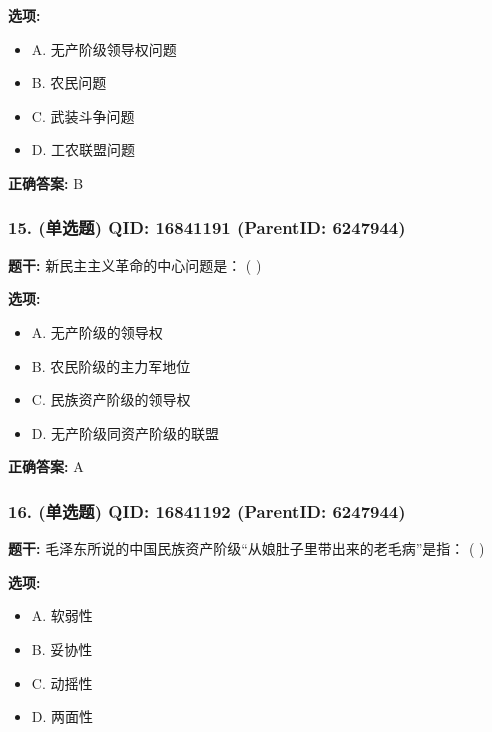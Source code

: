 \documentclass[12pt,UTF8]{ctexart}
\begin{document}
\textbf{选项:}
\begin{itemize}[leftmargin=*]

  \item A. 无产阶级领导权问题

  \item B. 农民问题

  \item C. 武装斗争问题

  \item D. 工农联盟问题

\end{itemize}

\textbf{正确答案:}
B

\vspace{0.3em}\hrulefill\vspace{0.7em}

\subsubsection*{15. (单选题) \small QID: 16841191 (ParentID: 6247944)}

\textbf{题干:}
新民主主义革命的中心问题是： ( )



\textbf{选项:}
\begin{itemize}[leftmargin=*]

  \item A. 无产阶级的领导权

  \item B. 农民阶级的主力军地位

  \item C. 民族资产阶级的领导权

  \item D. 无产阶级同资产阶级的联盟

\end{itemize}

\textbf{正确答案:}
A

\vspace{0.3em}\hrulefill\vspace{0.7em}

\subsubsection*{16. (单选题) \small QID: 16841192 (ParentID: 6247944)}

\textbf{题干:}
毛泽东所说的中国民族资产阶级“从娘肚子里带出来的老毛病”是指： ( )



\textbf{选项:}
\begin{itemize}[leftmargin=*]

  \item A. 软弱性

  \item B. 妥协性

  \item C. 动摇性

  \item D. 两面性

\end{itemize}
\end{document}
